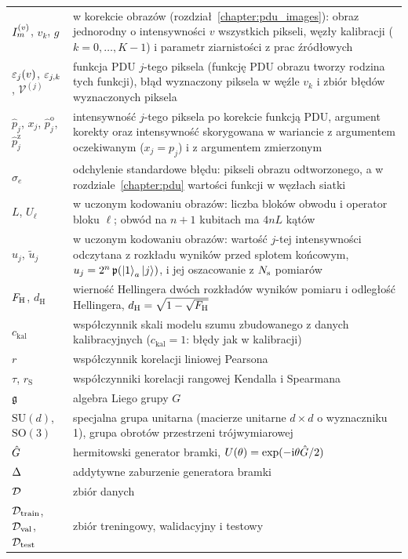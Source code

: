 \begin{longtable}{@{}p{}p{}@{}}
$I_m^{(v)}$, $v_k$, $g$ & w korekcie obrazów (rozdział~\ref{chapter:pdu_images}): obraz jednorodny o intensywności $v$ wszystkich pikseli, węzły kalibracji ($k=0,\dots,K-1$) i parametr ziarnistości z prac źródłowych \\
$\varepsilon_j(v)$, $\varepsilon_{j,k}$, $\mathcal{V}^{(j)}$ & funkcja PDU $j$-tego piksela (funkcję PDU obrazu tworzy rodzina tych funkcji), błąd wyznaczony piksela w węźle $v_k$ i zbiór błędów wyznaczonych piksela \\
$\hat{p}_j$, $x_j$, $\hat{p}^{\mathrm{o}}_j$, $\hat{p}^{\mathrm{z}}_j$ & intensywność $j$-tego piksela po korekcie funkcją PDU, argument korekty oraz intensywność skorygowana w wariancie z argumentem oczekiwanym ($x_j=p_j$) i z argumentem zmierzonym \\
$\sigma_e$ & odchylenie standardowe błędu: pikseli obrazu odtworzonego, a w rozdziale~\ref{chapter:pdu} wartości funkcji w węzłach siatki \\
$L$, $U_\ell$ & w uczonym kodowaniu obrazów: liczba bloków obwodu i operator bloku $\ell$; obwód na $n+1$ kubitach ma $4nL$ kątów \\
$u_j$, $\tilde{u}_j$ & w uczonym kodowaniu obrazów: wartość $j$-tej intensywności odczytana z rozkładu wyników przed splotem końcowym, $u_j=2^n\,\mathfrak{p}(\ket{1}_a\ket{j})$, i jej oszacowanie z $N_{\mathrm{s}}$ pomiarów \\
$F_{\mathrm{H}}$, $d_{\mathrm{H}}$ & wierność Hellingera dwóch rozkładów wyników pomiaru i odległość Hellingera, $d_{\mathrm{H}}=\sqrt{1-\sqrt{F_{\mathrm{H}}}}$ \\
$c_{\mathrm{kal}}$ & współczynnik skali modelu szumu zbudowanego z danych kalibracyjnych ($c_{\mathrm{kal}}=1$: błędy jak w kalibracji) \\
$r$ & współczynnik korelacji liniowej Pearsona \\
$\tau$, $r_{\mathrm{S}}$ & współczynniki korelacji rangowej Kendalla i Spearmana \\
$\mathfrak{g}$ & algebra Liego grupy $G$ \\
$\mathrm{SU}(d)$, $\mathrm{SO}(3)$ & specjalna grupa unitarna (macierze unitarne $d\times d$ o wyznaczniku 1), grupa obrotów przestrzeni trójwymiarowej \\
$\hat{G}$ & hermitowski generator bramki, $U(\theta)=\exp(-\mathrm{i}\theta\hat{G}/2)$ \\
$\Delta$ & addytywne zaburzenie generatora bramki \\
$\mathcal{D}$ & zbiór danych \\
$\mathcal{D}_{\mathrm{train}}$, $\mathcal{D}_{\mathrm{val}}$, $\mathcal{D}_{\mathrm{test}}$ & zbiór treningowy, walidacyjny i testowy \\

\end{longtable}
